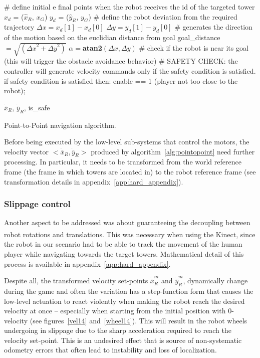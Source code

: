 \begin{algorithm}[ht]
	\# define initial e final points when the robot receives the id of the targeted tower \;
	$x_d$ = ($\hat{x}_R$, $x_G$)\;
	$y_d$ = ($\hat{y}_R$, $y_G$)\;
	\# define the robot deviation from the required trajectory\;
	$\Delta x = x_d[1] - x_d[0]$\;
	$\Delta y = y_d[1] - y_d[0]$\;
	\# generates the direction of the motion based on the euclidian distance from goal\;
	goal\_distance$ = \sqrt{({\Delta x}^2 + {\Delta y}^2)}$\;
	$\alpha = $\textbf{atan2}$(\Delta x, \Delta y)$\;
	\# check if the robot is near its goal (this will trigger the obstacle avoidance behavior)\;
	\# SAFETY CHECK: the controller will generate velocity commands only if the safety condition is satisfied. if safety condition is satisfied then: enable == 1 (player not too close to the robot);\;
	
	\Return $\dot{\bar{x}}_R$, $\dot{\bar{y}}_R$, is\_safe 
	\caption{Point-to-Point navigation algorithm.}
	\label{alg:pointopoint}
\end{algorithm}

Before being executed by the low-level sub-systems that control the motors, the velocity vector $<\dot{\bar{x}}_R,\dot{\bar{y}}_R>$ produced by algorithm~\ref{alg:pointopoint} need further processing. In particular, it needs to be transformed from the world reference frame (the frame in which towers are located in) to the robot reference frame (see transformation details in appendix~\ref{app:hard_appendix}).

\subsubsection{Slippage control} \label{sec:slippage}
Another aspect to be addressed was about guaranteeing the decoupling between robot rotations and translations. 
This was necessary when using the Kinect\textsuperscript{\textregistered}, since the robot in our scenario had to be able to track the movement of the human player while navigating towards the target towers. Mathematical detail of this process is available in appendix~\ref{app:hard_appendix}. 

Despite all, the transformed velocity set-points $\dot{\bar{x}}_R^m$ and $\dot{\bar{y}}_R^m$, dynamically change during the game and often the variation has a step-function form that causes the low-level actuation to react violently when making the robot reach the desired velocity at once -- especially when starting from the initial position with 0-velocity (see figures~\ref{vel14} and~\ref{wheel14}). This will result in the robot wheels undergoing in slippage due to the sharp acceleration required to reach the velocity set-point. This is an undesired effect that is source of non-systematic odometry errors that often lead to instability and loss of localization. 

